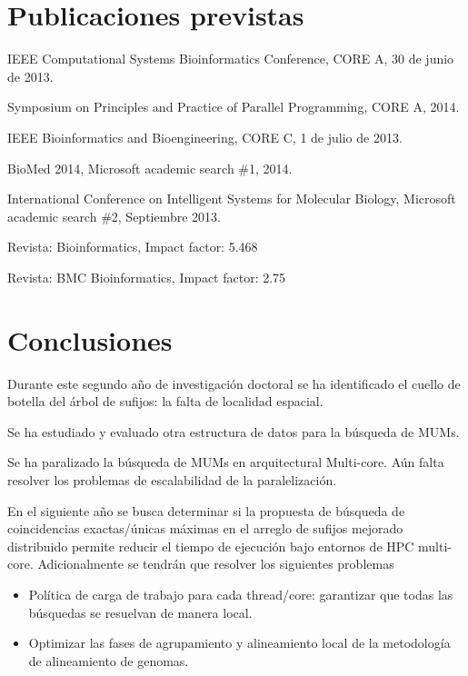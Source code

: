 \documentclass[12pt,a4paper]{article}
\begin{document}
\section{Publicaciones previstas}
IEEE Computational Systems Bioinformatics Conference, CORE A, 30 de junio de 2013. 

Symposium on Principles and Practice of Parallel Programming, CORE A, 2014.

IEEE Bioinformatics and Bioengineering, CORE C, 1 de julio de 2013.

BioMed 2014, Microsoft academic search \#1, 2014.

International Conference on Intelligent Systems for Molecular Biology, Microsoft academic search \#2, Septiembre 2013.

Revista: Bioinformatics, Impact factor: 5.468

Revista: BMC Bioinformatics, Impact factor: 2.75
\section{Conclusiones}
\indent
Durante este segundo año de investigación doctoral se ha identificado el cuello de botella del árbol de sufijos: la falta de localidad espacial.

Se ha estudiado y evaluado otra estructura de datos para la búsqueda de MUMs.

Se ha paralizado la búsqueda de MUMs en arquitectural Multi-core. Aún falta resolver los problemas de escalabilidad de la paralelización.

En el siguiente año se busca determinar si la propuesta de búsqueda de coincidencias exactas/únicas máximas en el arreglo de sufijos mejorado distribuido permite reducir el tiempo de ejecución bajo entornos de HPC multi-core. Adicionalmente se tendrán que resolver los siguientes problemas
\begin{itemize}
  \item Política de carga de trabajo para cada thread/core: garantizar que todas las búsquedas se resuelvan de manera local.
  \item Optimizar las fases de agrupamiento y alineamiento local de la metodología de alineamiento de genomas.
\end{itemize}
 
	
\end{document}
